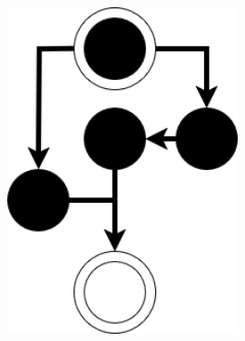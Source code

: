 \documentclass[12pt,a4paper]{article} %
\begin{document}
	\begin{figure}[h!]
		\centering
		\begin{minipage}[b]{0.3\textwidth}
			\centering
		\end{minipage}
		\begin{minipage}[b]{0.3\textwidth}
			\centering
			\includegraphics[width=0.6\textwidth]{images/workflow_icon.png}
		\end{minipage}
		\begin{minipage}[b]{0.3\textwidth}
			\centering

\end{minipage}
\end{figure}
\end{document}
